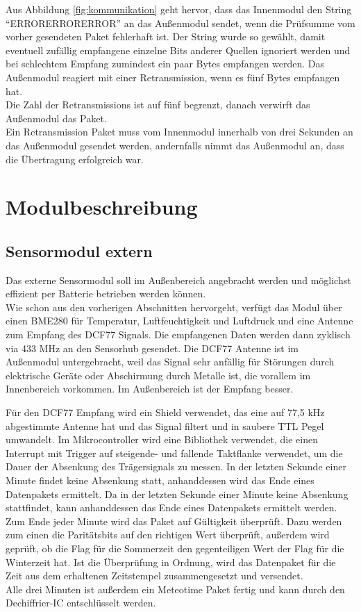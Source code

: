 \documentclass[a4paper,11pt]{article}
\begin{document}
\noindent
Aus Abbildung \ref{fig:kommunikation} geht hervor, dass das Innenmodul den String ``ERRORERRORERROR'' an das Außenmodul sendet, wenn die Prüfsumme vom vorher gesendeten Paket
fehlerhaft ist. Der String wurde so gewählt, damit eventuell zufällig empfangene einzelne Bits anderer Quellen ignoriert werden und bei schlechtem Empfang zumindest ein paar Bytes
empfangen werden. Das Außenmodul reagiert mit einer Retransmission, wenn es fünf Bytes empfangen hat. \\
Die Zahl der Retransmissions ist auf fünf begrenzt, danach verwirft das Außenmodul das Paket. \\
Ein Retransmission Paket muss vom Innenmodul innerhalb von drei Sekunden an das Außenmodul gesendet werden, andernfalls nimmt das Außenmodul an, dass die Übertragung
erfolgreich war. 

\section{Modulbeschreibung}
\label{sub:modulbeschreibung}

\subsection{Sensormodul extern}
\label{subsub:sensorModul_ext}

Das externe Sensormodul soll im Außenbereich angebracht werden und möglichst effizient per Batterie betrieben werden können. \\
Wie schon aus den vorherigen Abschnitten hervorgeht, verfügt das Modul über einen BME280 für Temperatur, Luftfeuchtigkeit und Luftdruck
und eine Antenne zum Empfang des DCF77 Signals. Die empfangenen Daten werden dann zyklisch via 433 MHz an den Sensorhub gesendet. Die DCF77 Antenne
ist im Außenmodul untergebracht, weil das Signal sehr anfällig für Störungen durch elektrische Geräte oder Abschirmung durch Metalle ist, 
die vorallem im Innenbereich vorkommen. Im Außenbereich ist der Empfang besser. 

\vspace{0.2cm}
\noindent
Für den DCF77 Empfang wird ein Shield verwendet, das eine auf 77,5 kHz abgestimmte Antenne hat und das Signal filtert und in saubere TTL Pegel umwandelt.
Im Mikrocontroller wird eine Bibliothek verwendet, die einen Interrupt mit Trigger auf steigende- und fallende Taktflanke verwendet, um die Dauer der Absenkung
des Trägersignals zu messen. In der letzten Sekunde einer Minute findet keine Absenkung statt, anhanddessen wird das Ende eines Datenpakets ermittelt.
Da in der letzten Sekunde einer Minute keine Absenkung stattfindet, kann anhanddessen das Ende eines Datenpakets ermittelt werden. 
Zum Ende jeder Minute wird das Paket auf Gültigkeit überprüft. Dazu werden zum einen die Paritätsbits auf den richtigen Wert überprüft, außerdem
wird geprüft, ob die Flag für die Sommerzeit den gegenteiligen Wert der Flag für die Winterzeit hat. 
Ist die Überprüfung in Ordnung, wird das Datenpaket für die Zeit aus dem erhaltenen Zeitstempel zusammengesetzt und versendet. \\
Alle drei Minuten ist außerdem ein Meteotime Paket fertig und kann durch den Dechiffrier-IC entschlüsselt werden. 
\end{document}
